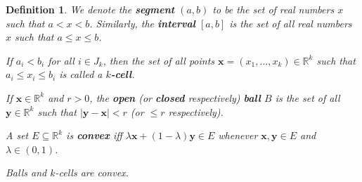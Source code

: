 \documentclass{scrbook}
\newcommand{\R}{\mathbb{R}}
\newtheorem{definition}{Definition}
\begin{document}
\begin{definition}
We denote the \textbf{segment} $(a, b)$ to be the set of real numbers $x$ such that $a < x < b$. Similarly, the \textbf{interval} $[a, b]$ is the set of all real numbers $x$ such that $a \le x \le b$. 

If $a_i < b_i$ for all $i \in J_k$, then the set of all points $\textbf{x} = (x_1, \dotsc, x_k) \in \R^k$ such that $a_i \le x_i \le b_i$ is called a \textbf{$k$-cell}.

If $\textbf{x} \in \R^k$ and $r > 0$, the \textbf{open} (or \textbf{closed} respectively) \textbf{ball} $B$ is the set of all $\textbf{y} \in \R^k$ such that $|\textbf{y} - \textbf{x}| < r$ (or $\le r$ respectively).

A set $E \subseteq \R^k$ is \textbf{convex} iff $\lambda \textbf{x} + (1 - \lambda) \textbf{y} \in E$ whenever $\textbf{x}, \textbf{y} \in E$ and $\lambda \in (0, 1)$.

Balls and $k$-cells are convex.  
\end{definition}
\end{document}
